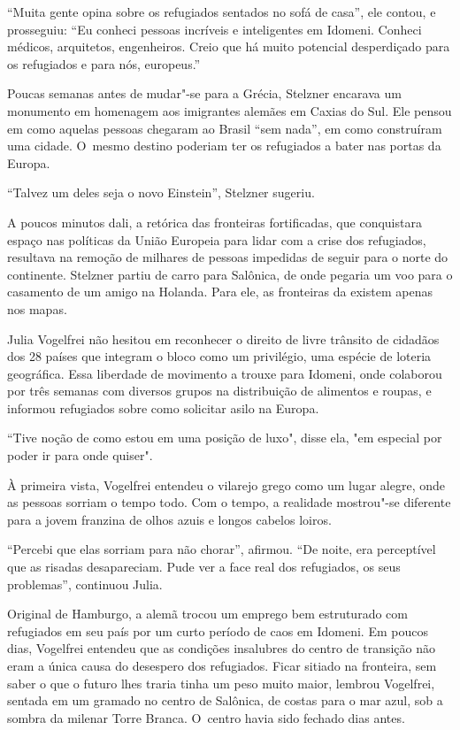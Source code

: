 ``Muita gente opina sobre os refugiados sentados no sofá de casa'',
ele contou, e prosseguiu: ``Eu conheci pessoas incríveis e inteligentes em Idomeni.
Conheci médicos, arquitetos, engenheiros. Creio que há muito potencial
desperdiçado para os refugiados e para nós, europeus.''

Poucas semanas antes de mudar"-se para a Grécia, Stelzner encarava um
monumento em homenagem aos imigrantes alemães em Caxias do Sul. Ele
pensou em como aquelas pessoas chegaram ao Brasil ``sem nada'', em como
construíram uma cidade. O~mesmo destino poderiam ter os refugiados a
bater nas portas da Europa.

``Talvez um deles seja o novo Einstein'', Stelzner sugeriu.

A poucos minutos dali, a retórica das fronteiras fortificadas, que
conquistara espaço nas políticas da União Europeia para lidar com a
crise dos refugiados, resultava na remoção de milhares de pessoas
impedidas de seguir para o norte do continente. Stelzner partiu de
carro para Salônica, de onde pegaria um voo para o casamento de um amigo
na Holanda. Para ele, as fronteiras da  existem apenas nos mapas.

Julia Vogelfrei não hesitou em reconhecer o direito de livre trânsito de
cidadãos dos 28 países que integram o bloco como um privilégio, uma espécie de loteria geográfica. 
Essa liberdade de movimento a trouxe para Idomeni, onde
colaborou por três semanas com diversos grupos na distribuição de
alimentos e roupas, e informou refugiados sobre como solicitar asilo
na Europa.

``Tive noção de como estou em uma posição de luxo", disse ela, "em especial por poder
ir para onde quiser".

À primeira vista, Vogelfrei entendeu o vilarejo grego como um lugar
alegre, onde as pessoas sorriam o tempo todo. Com o tempo, a realidade
mostrou"-se diferente para a jovem franzina de olhos azuis e longos
cabelos loiros.

``Percebi que elas sorriam para não chorar'', afirmou. ``De noite, era
perceptível que as risadas desapareciam. Pude ver a face real dos
refugiados, os seus problemas'', continuou Julia.

Original de Hamburgo, a alemã trocou um emprego bem estruturado com
refugiados em seu país por um curto período de caos em Idomeni. Em
poucos dias, Vogelfrei entendeu que as condições insalubres do centro de
transição não eram a única causa do desespero dos refugiados. Ficar
sitiado na fronteira, sem saber o que o futuro lhes traria tinha um
peso muito maior, lembrou Vogelfrei, sentada em um gramado no centro de
Salônica, de costas para o mar azul, sob a sombra da milenar Torre
Branca. O~centro havia sido fechado dias antes.

